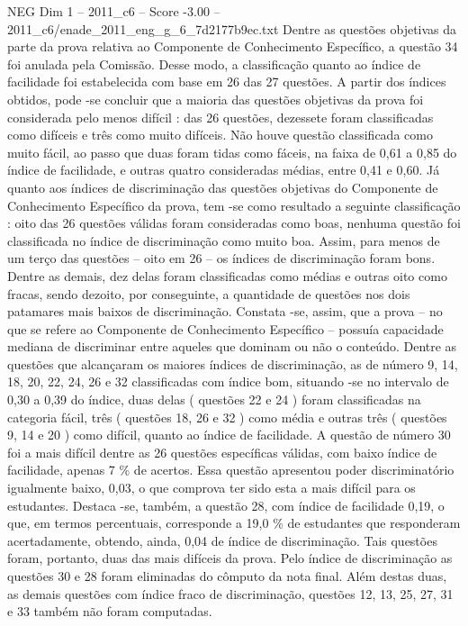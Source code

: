 \begin{textsample}{NEG Dim 1 – 2011\_c6 – Score -3.00 – 2011\_c6/enade\_2011\_eng\_g\_6\_7d2177b9ec.txt}
Dentre as questões objetivas da parte da prova relativa ao Componente de Conhecimento Específico, a questão 34 foi anulada pela Comissão.
Desse modo, a classificação quanto ao índice de facilidade foi estabelecida com base em 26 das 27 questões.
A partir dos índices obtidos, pode -se concluir que a maioria das questões objetivas da prova foi considerada pelo menos difícil : das 26 questões, dezessete foram classificadas como difíceis e três como muito difíceis.
Não houve questão classificada como muito fácil, ao passo que duas foram tidas como fáceis, na faixa de 0,61 a 0,85 do índice de facilidade, e outras quatro consideradas médias, entre 0,41 e 0,60.
Já quanto aos índices de discriminação das questões objetivas do Componente de Conhecimento Específico da prova, tem -se como resultado a seguinte classificação : oito das 26 questões válidas foram consideradas como boas, nenhuma questão foi classificada no índice de discriminação como muito boa.
Assim, para menos de um terço das questões – oito em 26 – os índices de discriminação foram bons.
Dentre as demais, dez delas foram classificadas como médias e outras oito como fracas, sendo dezoito, por conseguinte, a quantidade de questões nos dois patamares mais baixos de discriminação.
Constata -se, assim, que a prova – no que se refere ao Componente de Conhecimento Específico – possuía capacidade mediana de discriminar entre aqueles que dominam ou não o conteúdo.
Dentre as questões que alcançaram os maiores índices de discriminação, as de número 9, 14, 18, 20, 22, 24, 26 e 32 classificadas com índice bom, situando -se no intervalo de 0,30 a 0,39 do índice, duas delas ( questões 22 e 24 ) foram classificadas na categoria fácil, três ( questões 18, 26 e 32 ) como média e outras três ( questões 9, 14 e 20 ) como difícil, quanto ao índice de facilidade.
A questão de número 30 foi a mais difícil dentre as 26 questões específicas válidas, com baixo índice de facilidade, apenas 7 \% de acertos.
Essa questão apresentou poder discriminatório igualmente baixo, 0,03, o que comprova ter sido esta a mais difícil para os estudantes.
Destaca -se, também, a questão 28, com índice de facilidade 0,19, o que, em termos percentuais, corresponde a 19,0 \% de estudantes que responderam acertadamente, obtendo, ainda, 0,04 de índice de discriminação.
Tais questões foram, portanto, duas das mais difíceis da prova.
Pelo índice de discriminação as questões 30 e 28 foram eliminadas do cômputo da nota final.
Além destas duas, as demais questões com índice fraco de discriminação, questões 12, 13, 25, 27, 31 e 33 também não foram computadas.

\end{textsample}
